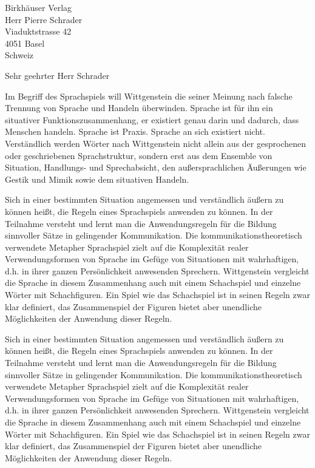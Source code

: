 \documentclass[personal,german,color]{ubletter}
\begin{document}
\begin{letter}{Birkhäuser Verlag \\ Herr Pierre Schrader \\
               Viaduktstrasse 42\\ 4051 Basel \\ Schweiz}						%

\subject{Briefpapier}											%
\opening{Sehr geehrter Herr Schrader}							%


Im Begriff des Sprachspiels will Wittgenstein die seiner Meinung
nach falsche Trennung von Sprache und Handeln überwinden. Sprache
ist für ihn ein situativer Funktionszusammenhang, er existiert genau
darin und dadurch, dass Menschen handeln. Sprache ist Praxis.
Sprache an sich existiert nicht. Verständlich werden Wörter nach
Wittgenstein nicht allein aus der gesprochenen oder geschriebenen
Sprachstruktur, sondern erst aus dem Ensemble von Situation,
Handlungs- und Sprechabsicht, den außersprachlichen Äußerungen wie
Gestik und Mimik sowie dem situativen Handeln.

Sich in einer bestimmten Situation angemessen und verständlich
äußern zu können heißt, die Regeln eines Sprachspiels anwenden zu
können. In der Teilnahme versteht und lernt man die Anwendungsregeln
für die Bildung sinnvoller Sätze in gelingender Kommunikation. Die
kommunikationstheoretisch verwendete Metapher Sprachspiel zielt auf
die Komplexität realer Verwendungsformen von Sprache im Gefüge von
Situationen mit wahrhaftigen, d.h. in ihrer ganzen Persönlichkeit
anwesenden Sprechern. Wittgenstein vergleicht die Sprache in diesem
Zusammenhang auch mit einem Schachspiel und einzelne Wörter mit
Schachfiguren. Ein Spiel wie das Schachspiel ist in seinen Regeln
zwar klar definiert, das Zusammenspiel der Figuren bietet aber
unendliche Möglichkeiten der Anwendung dieser Regeln.

Sich in einer bestimmten Situation angemessen und verständlich
äußern zu können heißt, die Regeln eines Sprachspiels anwenden zu
können. In der Teilnahme versteht und lernt man die Anwendungsregeln
für die Bildung sinnvoller Sätze in gelingender Kommunikation. Die
kommunikationstheoretisch verwendete Metapher Sprachspiel zielt auf
die Komplexität realer Verwendungsformen von Sprache im Gefüge von
Situationen mit wahrhaftigen, d.h. in ihrer ganzen Persönlichkeit
anwesenden Sprechern. Wittgenstein vergleicht die Sprache in diesem
Zusammenhang auch mit einem Schachspiel und einzelne Wörter mit
Schachfiguren. Ein Spiel wie das Schachspiel ist in seinen Regeln
zwar klar definiert, das Zusammenspiel der Figuren bietet aber
unendliche Möglichkeiten der Anwendung dieser Regeln.


\end{letter}
\end{document}
